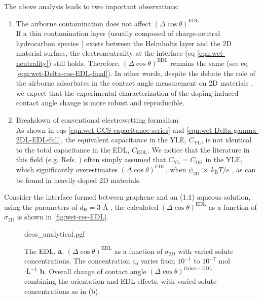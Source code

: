 The above analysis leads to two important observations:
\begin{enumerate}
\item The airborne contamination does not affect \((\Delta \cos
  \theta)^{\mathrm{EDL}}\) \\
  If a thin
contamination layer (usually composed of charge-neutral hydrocarbon
species \autocite{li_2013_airborne}) exists between the Helmholtz layer and
the 2D material surface, the electroneutrality at the interface (eq
\autoref{eqn:wet-neutrality}) still holds. Therefore, \((\Delta \cos
\theta)^{\mathrm{EDL}}\) remains the same (see eq
\autoref{eqn:wet-Delta-cos-EDL-final}). In other words, despite the
debate the role of the airborne adsorbates in the contact angle
measurement on 2D materials
\autocite{li_2013_airborne,Kozbial_2015_wetting_mos2,Xu_2013_withwhat,Chow_2015_wetting_WS2}, we expect
that the experimental characterization of the doping-induced contact
angle change is more robust and reproducible.

\item Breakdown of conventional electrowetting formalism \\
  As shown in eqs \autoref{eqn:wet-GCS-capacitance-series} and
  \autoref{eqn:wet-Delta-gamma-2DL-EDL-full}, the equivalent
  capacitance in the YLE, \(C_{\mathrm{YL}}\), is not identical to the
  total capacitance in the EDL, \(C_{\mathrm{EDL}}\). We notice that
  the literature in this field (e.g. Refs.
  \cite{Ostrowski_2014_tunable,Daub_2007_nanoscale_EW,goniszewski_correlation_2016,Ashraf_2016_doping})
  often simply assumed that \(C_{\mathrm{YL}}=C_{\mathrm{DH}}\) in the
  YLE, which significantly overestimates
  \((\Delta \cos \theta)^{\mathrm{EDL}}\), when
  \(\psi_{\mathrm{2D}} \gg k_{\mathrm{B}}T/e\)
  \autocite{Israelachvili_2011_book}, as can be found in heavily-doped
  2D materials.
\end{enumerate}

Consider the interface formed between graphene and an (1:1) aqueous
solution, using the parameters of \(d_{\mathrm{H}}=3\) Å
\autocite{Mcclendon_1927_helmholtz_EDL},
the calculated \((\Delta \cos \theta)^{\mathrm{EDL}}\) as a function
of \(\sigma_{\mathrm{2D}}\) is shown in \autoref{fig:wet-res-EDL}.
%
\begin{figure}[!htbp]
  \centering
  {dcos_analytical.pgf}
  \caption{\label{fig:wet-res-EDL} The EDL. \textbf{a}.
    \((\Delta\cos\theta)^{\mathrm{EDL}}\) as a function of
    \(\sigma_{\mathrm{2D}}\) with varied solute concentrations. The
    concentration \(c_{0}\) varies from \(10^{-1}\) to \(10^{-7}\)
    mol\(\cdot\mathrm{L}^{-1}\) \textbf{b}. Overall change of contact
    angle \((\Delta \cos \theta)^{\mathrm{Orien+EDL}}\) combining the
    orientation and EDL effects, with varied solute concentrations as
    in (b).}
\end{figure}


